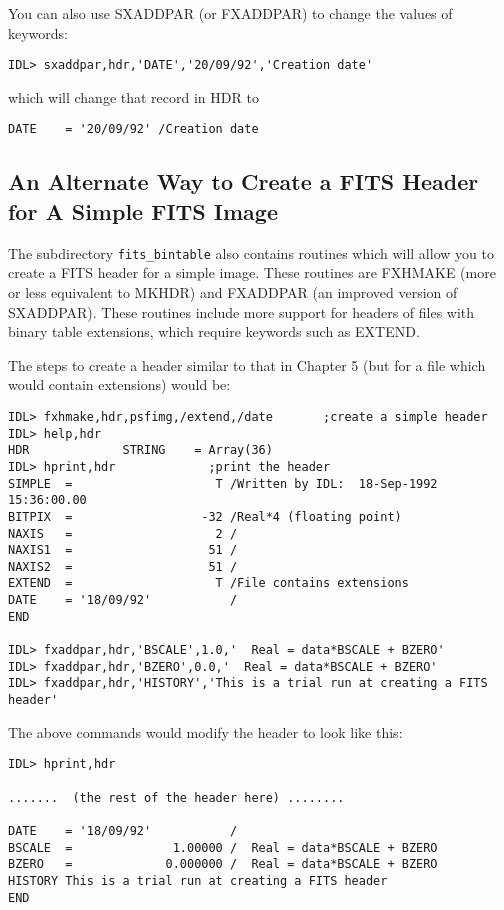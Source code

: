 You can also use SXADDPAR (or FXADDPAR) to change the values of keywords:

\medskip\noindent
\begin{verbatim}
IDL> sxaddpar,hdr,'DATE','20/09/92','Creation date'
\end{verbatim}
which will change that record in HDR to

\medskip\noindent
\begin{verbatim}
DATE    = '20/09/92' /Creation date
\end{verbatim}
 

\subsection{An Alternate Way to Create a FITS Header for A Simple FITS Image}
 
The subdirectory {\tt fits{\_}bintable} also contains routines which will allow you
to create a FITS header for a simple image. These routines are FXHMAKE
(more or less equivalent to MKHDR) and FXADDPAR (an improved version of
SXADDPAR). These routines include more support for headers of files with
binary table extensions, which require keywords such as EXTEND.
 
The steps to create a header similar to that in Chapter 5 (but for a file which
would contain extensions) would be:

\medskip\noindent
\begin{verbatim}
IDL> fxhmake,hdr,psfimg,/extend,/date		;create a simple header
IDL> help,hdr
HDR             STRING    = Array(36)
IDL> hprint,hdr				;print the header
SIMPLE  =                    T /Written by IDL:  18-Sep-1992 15:36:00.00
BITPIX  =                  -32 /Real*4 (floating point)
NAXIS   =                    2 /
NAXIS1  =                   51 /
NAXIS2  =                   51 /
EXTEND  =                    T /File contains extensions
DATE    = '18/09/92'           /
END
 
IDL> fxaddpar,hdr,'BSCALE',1.0,'  Real = data*BSCALE + BZERO'
IDL> fxaddpar,hdr,'BZERO',0.0,'  Real = data*BSCALE + BZERO'
IDL> fxaddpar,hdr,'HISTORY','This is a trial run at creating a FITS header'
\end{verbatim}
The above commands would modify the header to look like this:

\medskip\noindent
\begin{verbatim}
IDL> hprint,hdr
 
.......  (the rest of the header here) ........
 
DATE    = '18/09/92'           /
BSCALE  =              1.00000 /  Real = data*BSCALE + BZERO
BZERO   =             0.000000 /  Real = data*BSCALE + BZERO
HISTORY This is a trial run at creating a FITS header
END
\end{verbatim}
 

